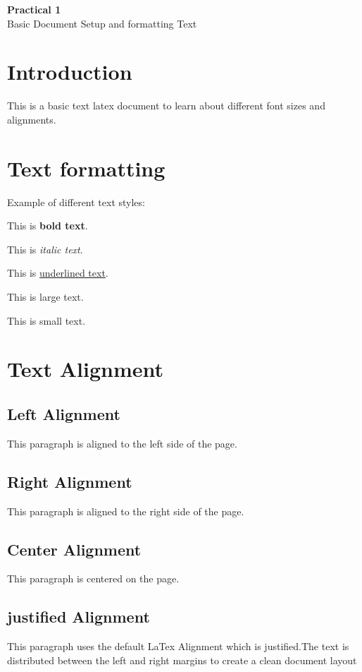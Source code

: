 \documentclass[12pt,a4paper]{article}
\begin{document}
\begin{center}
    {\Large \textbf{Practical 1}}\\[0.5cm]
    {\Large Basic Document Setup and formatting Text}
\end{center}

\section{Introduction}
This is a basic text latex document to learn about different font sizes and alignments.

\section{Text formatting}
Example of different text styles:

This is \textbf{bold text}.

This is \textit{italic text}.

This is \underline{underlined text}.

This is {\large large text}.

This is {\small small text}.

\section{Text Alignment}

\subsection{Left Alignment}

\begin{flushleft}
    This paragraph is aligned to the left side of the page.
\end{flushleft}

\subsection{Right Alignment}

\begin{flushright}
    This paragraph is aligned to the right side of the page.
\end{flushright}


\subsection{Center Alignment}

\begin{center}
    This paragraph is centered on the page.
\end{center}

\subsection{justified Alignment}
    This paragraph uses the default LaTex Alignment which is justified.The text is distributed between the left and right margins to create a clean document layout
\end{document}
